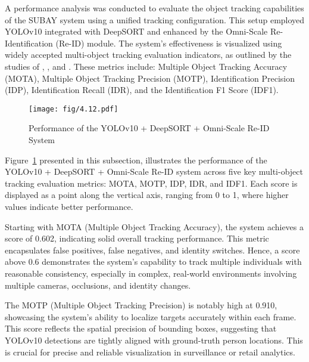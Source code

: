 {A performance analysis was conducted to evaluate the object tracking capabilities of the SUBAY system using a unified tracking configuration. This setup employed YOLOv10 integrated with DeepSORT and enhanced by the Omni-Scale Re-Identification (Re-ID) module. The system’s effectiveness is visualized using widely accepted multi-object tracking evaluation indicators, as outlined by the studies of \cite{Amosa2023}, \cite{Fei2023}, and \cite{Li2023}. These metrics include: Multiple Object Tracking Accuracy (MOTA), Multiple Object Tracking Precision (MOTP), Identification Precision (IDP), Identification Recall (IDR), and the Identification F1 Score (IDF1).

\begin{figure}[H]
	\caption[Performance of the YOLOv10 + DeepSORT + Omni-Scale Re-ID System]{\newline \newline Performance of the YOLOv10 + DeepSORT + Omni-Scale Re-ID System}
	\centering
	\texttt{[image: fig/4.12.pdf]}
	\label{fig:4.12}
\end{figure}

Figure~\ref{fig:4.12} presented in this subsection, illustrates the performance of the YOLOv10 + DeepSORT + Omni-Scale Re-ID system across five key multi-object tracking evaluation metrics: MOTA, MOTP, IDP, IDR, and IDF1. Each score is displayed as a point along the vertical axis, ranging from 0 to 1, where higher values indicate better performance.

Starting with MOTA (Multiple Object Tracking Accuracy), the system achieves a score of 0.602, indicating solid overall tracking performance. This metric encapsulates false positives, false negatives, and identity switches. Hence, a score above 0.6 demonstrates the system's capability to track multiple individuals with reasonable consistency, especially in complex, real-world environments involving multiple cameras, occlusions, and identity changes.

The MOTP (Multiple Object Tracking Precision) is notably high at 0.910, showcasing the system’s ability to localize targets accurately within each frame. This score reflects the spatial precision of bounding boxes, suggesting that YOLOv10 detections are tightly aligned with ground-truth person locations. This is crucial for precise and reliable visualization in surveillance or retail analytics.

}
